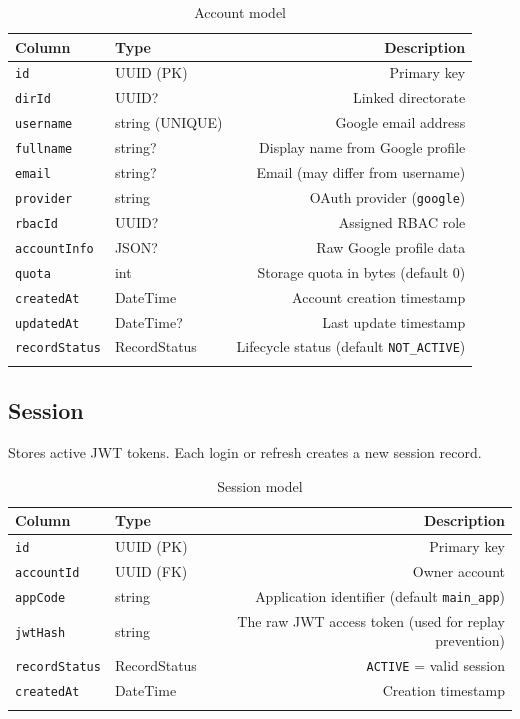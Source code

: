 \documentclass[12pt,a4paper]{article}
\begin{document}
\begin{longtable}{llD}
\toprule
\textbf{Column} & \textbf{Type} & \textbf{Description} \\
\midrule
\texttt{id}           & UUID (PK)     & Primary key \\
\texttt{dirId}        & UUID?         & Linked directorate \\
\texttt{username}     & string (UNIQUE) & Google email address \\
\texttt{fullname}     & string?       & Display name from Google profile \\
\texttt{email}        & string?       & Email (may differ from username) \\
\texttt{provider}     & string        & OAuth provider (\texttt{google}) \\
\texttt{rbacId}       & UUID?         & Assigned RBAC role \\
\texttt{accountInfo}  & JSON?         & Raw Google profile data \\
\texttt{quota}        & int           & Storage quota in bytes (default 0) \\
\texttt{createdAt}    & DateTime      & Account creation timestamp \\
\texttt{updatedAt}    & DateTime?     & Last update timestamp \\
\texttt{recordStatus} & RecordStatus  & Lifecycle status (default \texttt{NOT\_ACTIVE}) \\
\bottomrule
\caption{Account model}
\end{longtable}

\subsection{Session}

Stores active JWT tokens. Each login or refresh creates a new session record.

\begin{longtable}{llD}
\toprule
\textbf{Column} & \textbf{Type} & \textbf{Description} \\
\midrule
\texttt{id}           & UUID (PK)    & Primary key \\
\texttt{accountId}    & UUID (FK)    & Owner account \\
\texttt{appCode}      & string       & Application identifier (default \texttt{main\_app}) \\
\texttt{jwtHash}      & string       & The raw JWT access token (used for replay prevention) \\
\texttt{recordStatus} & RecordStatus & \texttt{ACTIVE} = valid session \\
\texttt{createdAt}    & DateTime     & Creation timestamp \\
\bottomrule
\caption{Session model}
\end{longtable}
\end{document}
